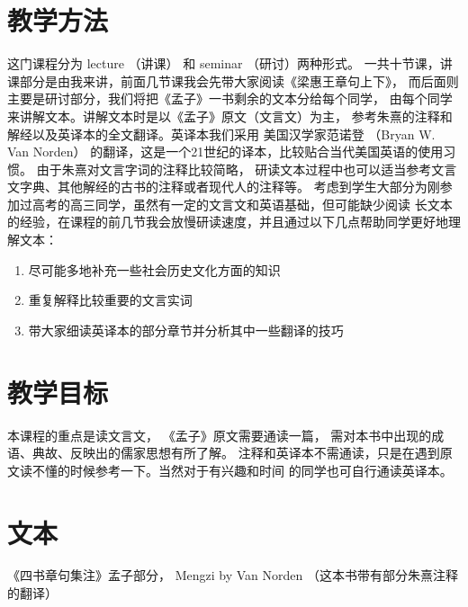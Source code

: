 \documentclass[12pt]{ctexart}
\begin{document}
\section{教学方法}
这门课程分为 lecture （讲课） 和 seminar （研讨）两种形式。
一共十节课，讲课部分是由我来讲，前面几节课我会先带大家阅读《梁惠王章句上下》，
而后面则主要是研讨部分，我们将把《孟子》一书剩余的文本分给每个同学，
由每个同学来讲解文本。讲解文本时是以《孟子》原文（文言文）为主，
参考朱熹的注释和解经以及英译本的全文翻译。英译本我们采用 美国汉学家范诺登
（Bryan W. Van Norden） 的翻译，这是一个21世纪的译本，比较贴合当代美国英语的使用习惯。
由于朱熹对文言字词的注释比较简略，
研读文本过程中也可以适当参考文言文字典、其他解经的古书的注释或者现代人的注释等。
考虑到学生大部分为刚参加过高考的高三同学，虽然有一定的文言文和英语基础，但可能缺少阅读
长文本的经验，在课程的前几节我会放慢研读速度，并且通过以下几点帮助同学更好地理解文本：
\begin{enumerate}
\item 尽可能多地补充一些社会历史文化方面的知识
\item 重复解释比较重要的文言实词
\item 带大家细读英译本的部分章节并分析其中一些翻译的技巧
\end{enumerate}
\section{教学目标}
本课程的重点是读文言文，
《孟子》原文需要通读一篇，
需对本书中出现的成语、典故、反映出的儒家思想有所了解。
注释和英译本不需通读，只是在遇到原文读不懂的时候参考一下。当然对于有兴趣和时间
的同学也可自行通读英译本。


\section{文本}
《四书章句集注》孟子部分， Mengzi by Van Norden （这本书带有部分朱熹注释的翻译）
\end{document}
